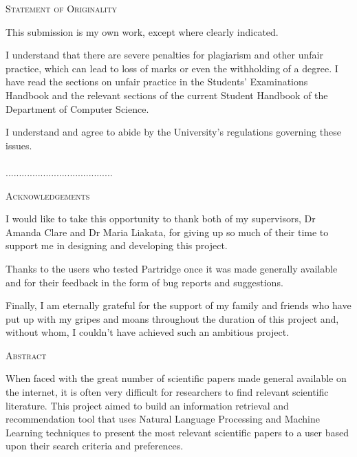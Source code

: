 \documentclass[11pt,a4paper,oneside]{book}
\begin{document}



\setlength{\parindent}{0pt}
\setlength{\parskip}{1.5ex plus 0.5ex minus 0.2ex}



\thispagestyle{plain}

\begin{center}
\textsc{\large Statement of Originality}
\end{center}

This submission is my own work, except where clearly indicated.  

I understand that there are severe penalties for plagiarism and other unfair
practice, which can lead to loss of marks or even the withholding of a degree.
I have read the sections on unfair practice in the Students’ Examinations
Handbook and the relevant sections of the current Student Handbook of the
Department of Computer Science.  

I understand and agree to abide by the University’s regulations governing these
issues.\\\\

........................................

\pagebreak
\thispagestyle{plain}

\begin{center}
\textsc{\large Acknowledgements}
\end{center}

I would like to take this opportunity to thank both of my
supervisors, Dr Amanda Clare and Dr Maria Liakata, for giving up so much of their
time to support me in designing and developing this project. 

Thanks to the users who tested Partridge once it was made generally available
and for their feedback in the form of bug reports and suggestions.

Finally, I am eternally grateful for the support of my family and friends who
have put up with my gripes and moans throughout the duration of this project
and, without whom, I couldn't have achieved such an ambitious project.

\pagebreak
\thispagestyle{plain}


\begin{center}
\textsc{\large Abstract}
\end{center}

When faced with the great number of scientific papers made general available on
the internet, it is often very difficult for researchers to find relevant
scientific literature. This project aimed to build an information retrieval and
recommendation tool that uses Natural Language Processing and Machine Learning
techniques to present the most relevant scientific papers to a user based upon
their search criteria and preferences.
\end{document}

